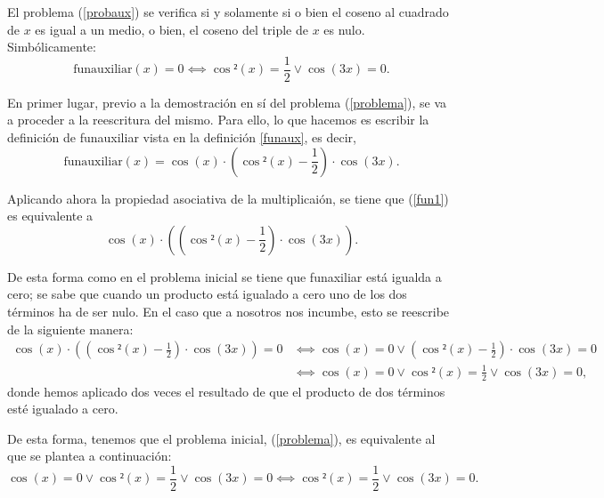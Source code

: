 \begin{lema}[CasosSolucion]\label{lemaCasosSolucion}
  El problema (\ref{probaux}) se verifica
  si y solamente si o bien el coseno al cuadrado de \(x\) es igual
  a un medio, o bien, el coseno del triple de \(x\) es nulo.
  Simbólicamente:
  \begin{equation}\label{problema}
    \text{funauxiliar}(x)=0 ⟺ \cos²(x)=\frac{1}{2} \lor
    \cos(3x)=0.
  \end{equation}
  \end{lema}
\begin{demostracion}
  En primer lugar, previo a la demostración en sí del problema
  (\ref{problema}), se va a proceder a la reescritura del mismo.
  Para ello, lo que hacemos es escribir la definición de
  funauxiliar vista en la definición \ref{funaux}, es decir,
  \begin{equation}\label{fun1}
    \text{funauxiliar}(x)=\cos(x)·(\cos²(x)-\frac{1}{2})·\cos(3x).
  \end{equation}

  Aplicando ahora la propiedad asociativa de la multiplicaión,
  se tiene que (\ref{fun1}) es equivalente a
  \begin{equation}\label{fun2}
    \cos(x)·((\cos²(x)-\frac{1}{2})·\cos(3x)).
  \end{equation}

  De esta forma como en el problema inicial se tiene que funaxiliar
  está igualda a cero; se sabe que cuando un producto está igualado
  a cero uno de los dos términos ha de ser nulo. En el caso que a
  nosotros nos incumbe, esto se reescribe de la siguiente manera:
  \begin{align}
    \cos(x)·((\cos²(x)-\frac{1}{2})·\cos(3x))=0 &⟺ \cos(x)=0
                                                  \lor (\cos²(x)-
                                                  \frac{1}{2})·
                                                  \cos(3x)=0 \\
    & ⟺ \cos(x)=0 \lor \cos²(x)=\frac{1}{2} \lor \cos(3x)=0,
  \end{align}
  donde hemos aplicado dos veces el resultado de que el producto
  de dos términos esté igualado a cero.

  De esta forma, tenemos que el problema inicial, (\ref{problema}),
  es equivalente al que se plantea a continuación:
  \begin{equation}\label{problemaEquiv2}
    \cos(x)=0 \lor \cos²(x)=\frac{1}{2} \lor \cos(3x)=0
    ⟺ \cos²(x)=\frac{1}{2} \lor \cos(3x)=0.
  \end{equation}


\end{demostracion}
